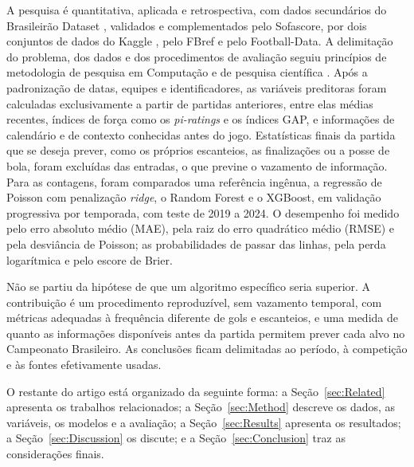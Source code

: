 A pesquisa é quantitativa, aplicada e retrospectiva, com dados secundários do Brasileirão Dataset \cite{brasileiraoDatasetGithub}, validados e complementados pelo Sofascore, por dois conjuntos de dados do Kaggle \cite{brazilianFootballMatches}, pelo FBref e pelo Football-Data. A delimitação do problema, dos dados e dos procedimentos de avaliação seguiu princípios de metodologia de pesquisa em Computação e de pesquisa científica \cite{wazlawick2014,marconiLakatos2021}. Após a padronização de datas, equipes e identificadores, as variáveis preditoras foram calculadas exclusivamente a partir de partidas anteriores, entre elas médias recentes, índices de força como os \textit{pi-ratings} e os índices GAP, e informações de calendário e de contexto conhecidas antes do jogo. Estatísticas finais da partida que se deseja prever, como os próprios escanteios, as finalizações ou a posse de bola, foram excluídas das entradas, o que previne o vazamento de informação. Para as contagens, foram comparados uma referência ingênua, a regressão de Poisson com penalização \textit{ridge}, o Random Forest e o XGBoost, em validação progressiva por temporada, com teste de 2019 a 2024. O desempenho foi medido pelo erro absoluto médio (MAE), pela raiz do erro quadrático médio (RMSE) e pela desviância de Poisson; as probabilidades de passar das linhas, pela perda logarítmica e pelo escore de Brier.

Não se partiu da hipótese de que um algoritmo específico seria superior. A contribuição é um procedimento reproduzível, sem vazamento temporal, com métricas adequadas à frequência diferente de gols e escanteios, e uma medida de quanto as informações disponíveis antes da partida permitem prever cada alvo no Campeonato Brasileiro. As conclusões ficam delimitadas ao período, à competição e às fontes efetivamente usadas.

O restante do artigo está organizado da seguinte forma: a Seção~\ref{sec:Related} apresenta os trabalhos relacionados; a Seção~\ref{sec:Method} descreve os dados, as variáveis, os modelos e a avaliação; a Seção~\ref{sec:Results} apresenta os resultados; a Seção~\ref{sec:Discussion} os discute; e a Seção~\ref{sec:Conclusion} traz as considerações finais.